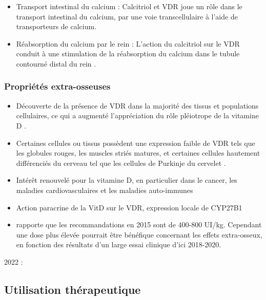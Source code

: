 \documentclass[
  letterpaper,
  DIV=11,
  numbers=noendperiod]{scrartcl}
\begin{document}
\begin{itemize}
\item
  Transport intestinal du calcium : Calcitriol et VDR joue un rôle dans
  le transport intestinal du calcium, par une voie transcellulaire à
  l'aide de transporteurs de calcium.
\item
  Réabsorption du calcium par le rein : L'action du calcitriol sur le
  VDR conduit à une stimulation de la réabsorption du calcium dans le
  tubule contourné distal du rein \autocite{Carmeliet.2015}.
\end{itemize}

\hypertarget{propriuxe9tuxe9s-extra-osseuses}{%
\subsubsection{Propriétés
extra-osseuses}\label{propriuxe9tuxe9s-extra-osseuses}}

\begin{itemize}
\item
  Découverte de la présence de VDR dans la majorité des tissus et
  populations cellulaires, ce qui a augmenté l'appréciation du rôle
  pléiotrope de la vitamine D \autocite{Rosen.2012}.
\item
  Certaines cellules ou tissus possèdent une expression faible de VDR
  tels que les globules rouges, les muscles striés matures, et certaines
  cellules hautement différenciés du cerveau tel que les cellules de
  Purkinje du cervelet \autocite{Bouillon.2008}.
\item
  Intérêt renouvelé pour la vitamine D, en particulier dans le cancer,
  les maladies cardiovasculaires et les maladies auto-immunes
\item
  Action paracrine de la VitD sur le VDR, expression locale de CYP27B1
  \autocite{Carmeliet.2015}
\item
  \textcite{Carmeliet.2015} rapporte que les recommandations en 2015
  sont de 400-800 UI/kg. Cependant une dose plus élevée pourrait être
  bénéfique concernant les effets extra-osseux, en fonction des
  résultats d'un large essai clinique d'ici 2018-2020.
\end{itemize}

2022 :

\hypertarget{utilisation-thuxe9rapeutique}{%
\subsection{Utilisation
thérapeutique}\label{utilisation-thuxe9rapeutique}}
\end{document}
